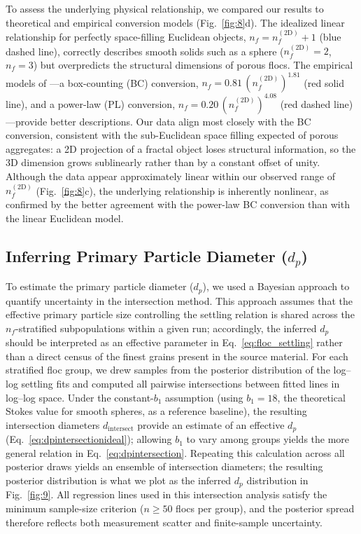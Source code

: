 \documentclass{agujournal2019}
\begin{document}
To assess the underlying physical relationship, we compared our results to theoretical and empirical conversion models (Fig.~\ref{fig:8}d). The idealized linear relationship for perfectly space-filling Euclidean objects, \(n_f = n_f^{(2\mathrm{D})} + 1\) (blue dashed line), correctly describes smooth solids such as a sphere (\(n_f^{(2\mathrm{D})}=2\), \(n_f=3\)) but overpredicts the structural dimensions of porous flocs. The empirical models of ---a box-counting (BC) conversion, \(n_f = 0.81\,(n_f^{(2\mathrm{D})})^{1.81}\) (red solid line), and a power-law (PL) conversion, \(n_f = 0.20\,(n_f^{(2\mathrm{D})})^{4.08}\) (red dashed line)---provide better descriptions. Our data align most closely with the BC conversion, consistent with the sub-Euclidean space filling expected of porous aggregates: a 2D projection of a fractal object loses structural information, so the 3D dimension grows sublinearly rather than by a constant offset of unity. Although the data appear approximately linear within our observed range of \(n_f^{(2\mathrm{D})}\) (Fig.~\ref{fig:8}c), the underlying relationship is inherently nonlinear, as confirmed by the better agreement with the power-law BC conversion than with the linear Euclidean model.

\subsection{Inferring Primary Particle Diameter ($d_p$)}

To estimate the primary particle diameter ($d_p$), we used a Bayesian approach to quantify uncertainty in the intersection method. This approach assumes that the effective primary particle size controlling the settling relation is shared across the $n_f$-stratified subpopulations within a given run; accordingly, the inferred $d_p$ should be interpreted as an effective parameter in Eq.~\eqref{eq:floc_settling} rather than a direct census of the finest grains present in the source material. For each stratified floc group, we drew samples from the posterior distribution of the log--log settling fits and computed all pairwise intersections between fitted lines in log--log space. Under the constant-$b_1$ assumption (using $b_1 = 18$, the theoretical Stokes value for smooth spheres, as a reference baseline), the resulting intersection diameters $d_\text{intersect}$ provide an estimate of an effective $d_p$ (Eq.~\eqref{eq:dpintersectionideal}); allowing $b_1$ to vary among groups yields the more general relation in Eq.~\eqref{eq:dpintersection}. Repeating this calculation across all posterior draws yields an ensemble of intersection diameters; the resulting posterior distribution is what we plot as the inferred $d_p$ distribution in Fig.~\ref{fig:9}. All regression lines used in this intersection analysis satisfy the minimum sample-size criterion ($n\ge50$ flocs per group), and the posterior spread therefore reflects both measurement scatter and finite-sample uncertainty.
\end{document}

